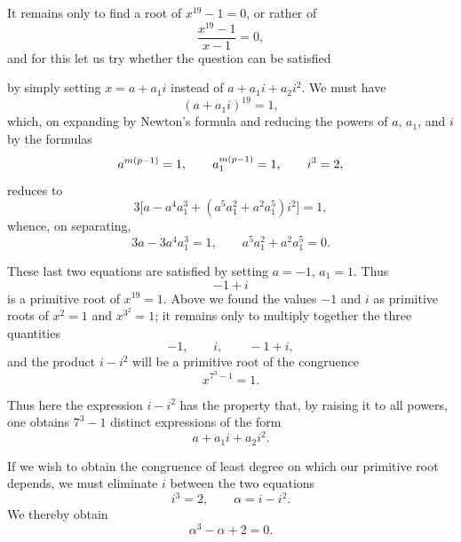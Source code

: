 It remains only to find a root of $x^{19}-1=0$, or rather of
\[
\frac{x^{19}-1}{x-1}=0,
\]
and for this let us try whether the question can be satisfied


by simply setting $x=a+a_1i$ instead of $a+a_1i+a_2i^2$. We must have
\[
(a+a_1i)^{19}=1,
\]
which, on expanding by Newton's formula and reducing the powers of
$a$, $a_1$, and $i$ by the formulas
\[
\GalSourceError{a^{m(p-1)}=1,\qquad a_1^{m(p-1)}=1}{W07-SE002: these Fermat reductions require a and a_1 to be nonzero modulo p; that restriction is not printed},
\qquad i^3=2,
\]
reduces to
\[
3\bigl[a-a^4a_1^3+(a^5a_1^2+a^2a_1^5)i^2\bigr]=1,
\]
whence, on separating,
\[
3a-3a^4a_1^3=1,\qquad a^5a_1^2+a^2a_1^5=0.
\]


These last two equations are satisfied by setting $a=-1$, $a_1=1$.
Thus
\[
-1+i
\]
is a primitive root of $x^{19}=1$. Above we found the values $-1$ and
$i$ as primitive roots of $x^2=1$ and $x^{3^2}=1$; it remains only to
multiply together the three quantities
\[
-1,\qquad i,\qquad -1+i,
\]
and the product $i-i^2$ will be a primitive root of the congruence
\[
x^{7^3-1}=1.
\]

Thus here the expression $i-i^2$ has the property that, by raising it
to all powers, one obtains $7^3-1$ distinct expressions of the form
\[
a+a_1i+a_2i^2.
\]

If we wish to obtain the congruence of least degree on which our
primitive root depends, we must eliminate $i$ between the two equations
\[
i^3=2,\qquad \alpha=i-i^2.
\]
We thereby obtain
\[
\alpha^3-\alpha+2=0.
\]

